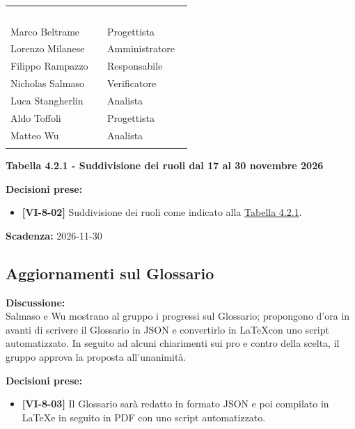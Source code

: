 \documentclass[12pt,a4paper]{article}
\newcommand{\tightlist}{\setlength{\itemsep}{1pt}\setlength{\parskip}{0pt}}
\begin{document}
\hypertarget{tab-4.2.1}{
\begin{center}
\begin{tabularx}{\linewidth}{>{\raggedright\arraybackslash}X>{\raggedright\arraybackslash}X}
\rowcolor{bfblue}\textcolor{white}{\textbf{Nome e Cognome}} & \textcolor{white}{\textbf{Ruolo Progetto}}\\
Marco Beltrame & Progettista \\ \arrayrulecolor{bfline}\hline
Lorenzo Milanese & Amministratore \\ \arrayrulecolor{bfline}\hline
Filippo Rampazzo & Responsabile \\ \arrayrulecolor{bfline}\hline
Nicholas Salmaso & Verificatore \\ \arrayrulecolor{bfline}\hline
Luca Stangherlin & Analista \\ \arrayrulecolor{bfline}\hline
Aldo Toffoli & Progettista \\ \arrayrulecolor{bfline}\hline
Matteo Wu & Analista \\ \arrayrulecolor{bfline}\hline
\end{tabularx}
\textbf{Tabella 4.2.1 - Suddivisione dei ruoli dal 17 al 30 novembre 2026}
\end{center}
}

\textbf{Decisioni prese:}
\begin{itemize}
\tightlist
\item[$\checkmark$] \textbf{[VI-8-02]} Suddivisione dei ruoli come indicato alla \hyperlink{tab-4.2.1}{Tabella 4.2.1}.
\end{itemize}

\textbf{Scadenza:} 2026-11-30

\hypertarget{odg-3}{%
\subsection{Aggiornamenti sul Glossario}}
\textbf{Discussione:} \\
Salmaso e Wu mostrano al gruppo i progressi sul Glossario; propongono d'ora in avanti di scrivere il Glossario in JSON e convertirlo in \LaTeX con uno script automatizzato. In seguito ad alcuni chiarimenti sui pro e contro della scelta, il gruppo approva la proposta all'unanimità.

\textbf{Decisioni prese:}
\begin{itemize}
\tightlist
\item[$\checkmark$] \textbf{[VI-8-03]} Il Glossario sarà redatto in formato JSON e poi compilato in \LaTeX e in seguito in PDF con uno script automatizzato.
\end{itemize}
\end{document}
